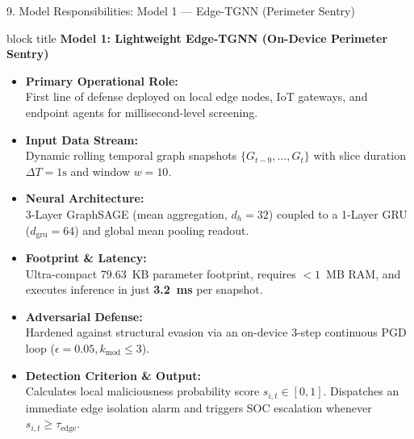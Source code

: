 \documentclass[aspectratio=169,10pt]{beamer}
\begin{document}
\begin{frame}{9. Model Responsibilities: Model 1 — Edge-TGNN (Perimeter Sentry)}
\vspace{0.15em}
\begin{beamercolorbox}[rounded=true,shadow=false,sep=0.35em,wd=\textwidth]{block title}
\textbf{\scriptsize Model 1: Lightweight Edge-TGNN (On-Device Perimeter Sentry)}
\end{beamercolorbox}
\vspace{0.15em}
{\fontsize{7.5pt}{10.5pt}\selectfont
\begin{itemize}\itemsep0.22em
  \item \textbf{Primary Operational Role:}\\
  First line of defense deployed on local edge nodes, IoT gateways, and endpoint agents for millisecond-level screening.
  \item \textbf{Input Data Stream:}\\
  Dynamic rolling temporal graph snapshots $\{G_{t-9}, \dots, G_t\}$ with slice duration $\Delta T = 1\text{s}$ and window $w = 10$.
  \item \textbf{Neural Architecture:}\\
  3-Layer GraphSAGE (mean aggregation, $d_h=32$) coupled to a 1-Layer GRU ($d_{\text{gru}}=64$) and global mean pooling readout.
  \item \textbf{Footprint \& Latency:}\\
  Ultra-compact 79.63~KB parameter footprint, requires $<1$~MB RAM, and executes inference in just \textbf{3.2~ms} per snapshot.
  \item \textbf{Adversarial Defense:}\\
  Hardened against structural evasion via an on-device 3-step continuous PGD loop ($\epsilon=0.05, k_{\text{mod}} \le 3$).
  \item \textbf{Detection Criterion \& Output:}\\
  Calculates local maliciousness probability score $s_{i,t} \in [0,1]$. Dispatches an immediate edge isolation alarm and triggers SOC escalation whenever $s_{i,t} \ge \tau_{\text{edge}}$.
\end{itemize}
}
\end{frame}
\end{document}
